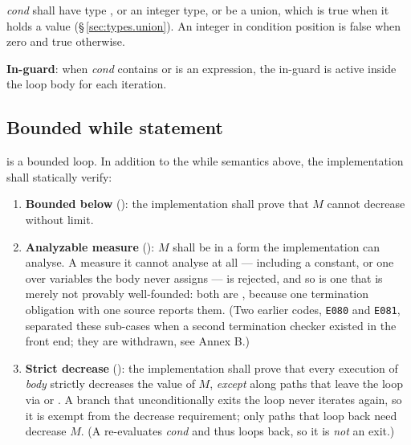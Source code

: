 \begin{constraint}
  \textit{cond} shall have type , or an integer type, or be a union, which is
  true when it holds a value (\S\,\ref{sec:types.union}).  An integer in condition position is false when
  zero and true otherwise.
\end{constraint}

\pnum
\textbf{In-guard}: when \textit{cond} contains or is an 
expression, the in-guard is active inside the loop body for each
iteration.

\subsection{Bounded while statement}
\label{sec:stmt.while.bounded}

\pnum
{} is a bounded loop.  In addition
to the while semantics above, the implementation shall statically verify:

\begin{enumerate}
  \item \textbf{Bounded below} (): the implementation shall
        prove that $M$ cannot decrease without limit.
  \item \textbf{Analyzable measure} (): $M$ shall be in a form
        the implementation can analyse.  A measure it cannot analyse at all ---
        including a constant, or one over variables the body never assigns ---
        is rejected, and so is one that is merely not provably well-founded:
        both are , because one termination obligation with one
        source reports them.  (Two earlier codes, \texttt{E080} and
        \texttt{E081}, separated these sub-cases when a second termination
        checker existed in the front end; they are withdrawn, see Annex B.)
  \item \textbf{Strict decrease} (): the implementation
        shall prove that every execution of \textit{body} strictly
        decreases the value of $M$, \emph{except} along paths that leave the
        loop via  or .  A branch that unconditionally
        exits the loop never iterates again, so it is exempt from the decrease
        requirement; only paths that loop back need decrease $M$.  (A
         re-evaluates \textit{cond} and thus loops back, so it
        is \emph{not} an exit.)
\end{enumerate}


